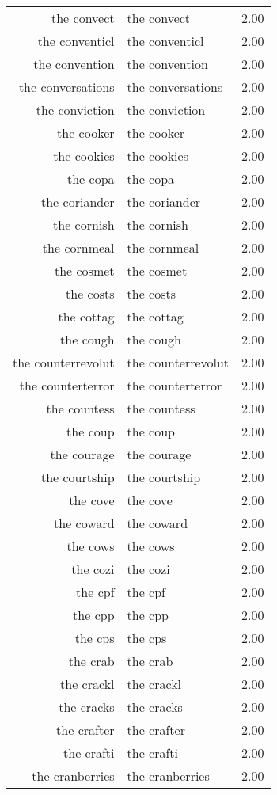 \begin{table}[ht]
\begin{tabular}{rlr}
  the convect & the convect & 2.00 \\ 
  the conventicl & the conventicl & 2.00 \\ 
  the convention & the convention & 2.00 \\ 
  the conversations & the conversations & 2.00 \\ 
  the conviction & the conviction & 2.00 \\ 
  the cooker & the cooker & 2.00 \\ 
  the cookies & the cookies & 2.00 \\ 
  the copa & the copa & 2.00 \\ 
  the coriander & the coriander & 2.00 \\ 
  the cornish & the cornish & 2.00 \\ 
  the cornmeal & the cornmeal & 2.00 \\ 
  the cosmet & the cosmet & 2.00 \\ 
  the costs & the costs & 2.00 \\ 
  the cottag & the cottag & 2.00 \\ 
  the cough & the cough & 2.00 \\ 
  the counterrevolut & the counterrevolut & 2.00 \\ 
  the counterterror & the counterterror & 2.00 \\ 
  the countess & the countess & 2.00 \\ 
  the coup & the coup & 2.00 \\ 
  the courage & the courage & 2.00 \\ 
  the courtship & the courtship & 2.00 \\ 
  the cove & the cove & 2.00 \\ 
  the coward & the coward & 2.00 \\ 
  the cows & the cows & 2.00 \\ 
  the cozi & the cozi & 2.00 \\ 
  the cpf & the cpf & 2.00 \\ 
  the cpp & the cpp & 2.00 \\ 
  the cps & the cps & 2.00 \\ 
  the crab & the crab & 2.00 \\ 
  the crackl & the crackl & 2.00 \\ 
  the cracks & the cracks & 2.00 \\ 
  the crafter & the crafter & 2.00 \\ 
  the crafti & the crafti & 2.00 \\ 
  the cranberries & the cranberries & 2.00 \\ 

\end{tabular}
\end{table}
